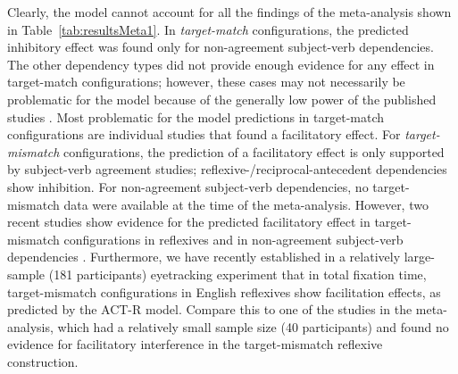 \documentclass{cambridge7A}\usepackage[]{graphicx}\usepackage[]{color}
\begin{document}
Clearly, the model cannot account for all the findings of the meta-analysis shown in Table~\ref{tab:resultsMeta1}. 
In \emph{target-match} configurations, the predicted inhibitory effect was found only for non-agreement subject-verb dependencies. The other dependency types did not provide enough evidence for any effect in target-match configurations; however, these cases may not necessarily be problematic for the model because of the generally low power of the published studies  \citep[see][for discussion]{nicenboimexploratory,JaegerEngelmannVasishth2017,VasishthMertzenJaegerGelman2018,JaegerMertzenVanDykeVasishth2019}. 
Most problematic for the model predictions in target-match configurations are individual studies that found a facilitatory effect. 
For \emph{target-mismatch} configurations, the prediction of a facilitatory effect is only supported by subject-verb agreement studies; reflexive-/reciprocal-antecedent dependencies show inhibition. For non-agreement subject-verb dependencies, no target-mismatch data were available at the time of the meta-analysis. However, two recent studies show evidence for the predicted facilitatory effect in target-mismatch configurations in reflexives \citep{parker2017reflexive} and in non-agreement subject-verb dependencies \citep{CunningsSturt2018}. Furthermore, we have recently established in a relatively large-sample (181 participants) eyetracking experiment \citep{JaegerMertzenVanDykeVasishth2019} that in total fixation time, target-mismatch configurations in English reflexives show facilitation effects, as predicted by the ACT-R model. Compare this to one of the studies \citep{DillonMishlerSloggett2013} in the meta-analysis, which had a relatively small sample size (40 participants) and found no evidence for facilitatory interference in the target-mismatch reflexive construction.
\end{document}
